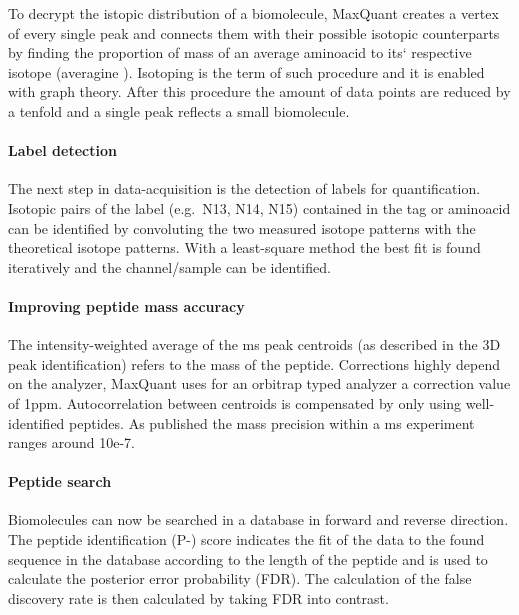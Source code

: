 \documentclass[
  11pt,
]{article}
\begin{document}
To decrypt the istopic distribution of a biomolecule, MaxQuant creates a
vertex of every single peak and connects them with their possible
isotopic counterparts by finding the proportion of mass of an average
aminoacid to its` respective isotope (averagine \citep{Senko1995}).
Isotoping is the term of such procedure and it is enabled with graph
theory. After this procedure the amount of data points are reduced by a
tenfold and a single peak reflects a small biomolecule.

\hypertarget{label-detection}{%
\paragraph{Label detection}\label{label-detection}}

The next step in data-acquisition is the detection of labels for
quantification. Isotopic pairs of the label (e.g.~N13, N14, N15)
contained in the tag or aminoacid can be identified by convoluting the
two measured isotope patterns with the theoretical isotope patterns.
With a least-square method the best fit is found iteratively and the
channel/sample can be identified.

\hypertarget{improving-peptide-mass-accuracy}{%
\paragraph{Improving peptide mass
accuracy}\label{improving-peptide-mass-accuracy}}

The intensity-weighted average of the ms peak centroids (as described in
the 3D peak identification) refers to the mass of the peptide.
Corrections highly depend on the analyzer, MaxQuant uses for an orbitrap
typed analyzer a correction value of 1ppm. Autocorrelation between
centroids is compensated by only using well-identified peptides. As
published the mass precision within a ms experiment ranges around 10e-7.

\hypertarget{peptide-search}{%
\paragraph{Peptide search}\label{peptide-search}}

Biomolecules can now be searched in a database in forward and reverse
direction. The peptide identification (P-) score indicates the fit of
the data to the found sequence in the database according to the length
of the peptide and is used to calculate the posterior error probability
(FDR). The calculation of the false discovery rate is then calculated by
taking FDR into contrast.
\end{document}
